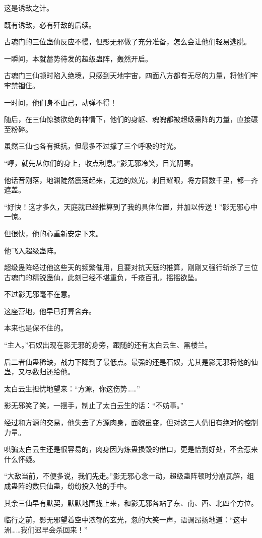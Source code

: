 \begin{this_body}
这是诱敌之计。

既有诱敌，必有歼敌的后续。

古魂门的三位蛊仙反应不慢，但影无邪做了充分准备，怎么会让他们轻易逃脱。

一瞬间，本就蓄势待发的超级蛊阵，轰然开启。

古魂门三仙顿时陷入绝境，只感到天地宇宙，四面八方都有无尽的力量，将他们牢牢禁锢住。

一时间，他们身不由己，动弹不得！

随后，在三仙惊骇欲绝的神情下，他们的身躯、魂魄都被超级蛊阵的力量，直接碾至粉碎。

虽然三仙也各有抵抗，但最多不过撑了三个呼吸的时光。

“哼，就先从你们的身上，收点利息。”影无邪冷笑，目光阴寒。

他话音刚落，地渊陡然震荡起来，无边的炫光，刺目耀眼，将方圆数千里，都一齐遮盖。

“好快！这才多久，天庭就已经推算到了我的具体位置，并加以传送！”影无邪心中一惊。

但很快，他的心重新安定下来。

他飞入超级蛊阵。

超级蛊阵经过他这些天的频繁催用，且要对抗天庭的推算，刚刚又强行斩杀了三位古魂门的精锐蛊仙，此刻已经不堪重负，千疮百孔，摇摇欲坠。

不过影无邪毫不在意。

这座营地，他早已打算舍弃。

本来也是保不住的。

“主人。”石奴出现在影无邪的身旁，跟随的还有太白云生、黑楼兰。

后二者仙蛊稀缺，战力下降到了最低点。最强的还是石奴，尤其是影无邪将他的仙蛊，又尽数归还给他。

太白云生担忧地望来：“方源，你这伤势……”

影无邪笑了笑，一摆手，制止了太白云生的话：“不妨事。”

经过和方源的交易，他失去了方源肉身，面貌虽变，但对这三人仍旧有绝对的控制力量。

哄骗太白云生还是很容易的，肉身因为炼蛊损毁的借口，更是恰到好处，不会惹来什么怀疑。

“大敌当前，不便多说，我们先走。”影无邪心念一动，超级蛊阵顿时分崩瓦解，组成蛊阵的数只仙蛊，纷纷投入他的手中。

其余三仙早有默契，默默地围拢上来，和影无邪各站了东、南、西、北四个方位。

临行之前，影无邪望着空中浓郁的玄光，忽的大笑一声，语调昂扬地道：“这中洲……我们迟早会杀回来！”


\end{this_body}
